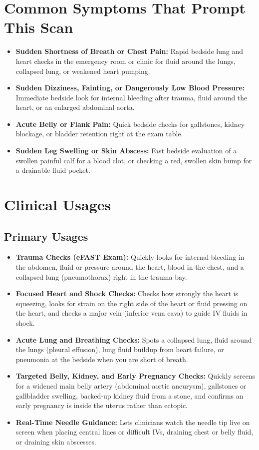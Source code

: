 \section{Common Symptoms That Prompt This Scan}
\begin{itemize}
    \item \textbf{Sudden Shortness of Breath or Chest Pain:} Rapid bedside lung and heart checks in the emergency room or clinic for fluid around the lungs, collapsed lung, or weakened heart pumping.
    \item \textbf{Sudden Dizziness, Fainting, or Dangerously Low Blood Pressure:} Immediate bedside look for internal bleeding after trauma, fluid around the heart, or an enlarged abdominal aorta.
    \item \textbf{Acute Belly or Flank Pain:} Quick bedside checks for gallstones, kidney blockage, or bladder retention right at the exam table.
    \item \textbf{Sudden Leg Swelling or Skin Abscess:} Fast bedside evaluation of a swollen painful calf for a blood clot, or checking a red, swollen skin bump for a drainable fluid pocket.
\end{itemize}

\section{Clinical Usages}

\subsection{Primary Usages}

\begin{itemize}
    \item \textbf{Trauma Checks (eFAST Exam):} Quickly looks for internal bleeding in the abdomen, fluid or pressure around the heart, blood in the chest, and a collapsed lung (pneumothorax) right in the trauma bay.
    \item \textbf{Focused Heart and Shock Checks:} Checks how strongly the heart is squeezing, looks for strain on the right side of the heart or fluid pressing on the heart, and checks a major vein (inferior vena cava) to guide IV fluids in shock.
    \item \textbf{Acute Lung and Breathing Checks:} Spots a collapsed lung, fluid around the lungs (pleural effusion), lung fluid buildup from heart failure, or pneumonia at the bedside when you are short of breath.
    \item \textbf{Targeted Belly, Kidney, and Early Pregnancy Checks:} Quickly screens for a widened main belly artery (abdominal aortic aneurysm), gallstones or gallbladder swelling, backed-up kidney fluid from a stone, and confirms an early pregnancy is inside the uterus rather than ectopic.
    \item \textbf{Real-Time Needle Guidance:} Lets clinicians watch the needle tip live on screen when placing central lines or difficult IVs, draining chest or belly fluid, or draining skin abscesses.
\end{itemize}

